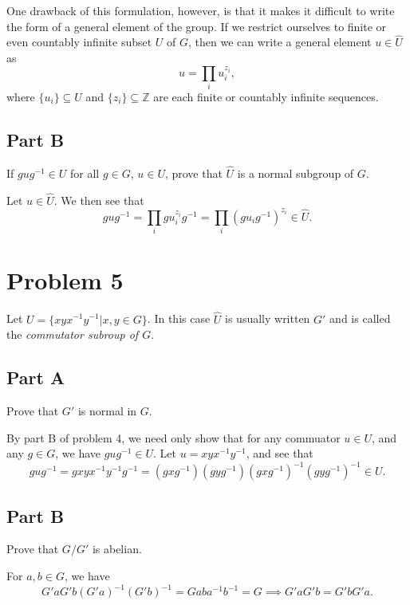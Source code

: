 \documentclass[12pt]{article}
\newcommand{\Z}{\mathbb{Z}}
\begin{document}
One drawback of this formulation, however, is that it makes it difficult to write
the form of a general element of the group.  If we restrict ourselves to finite or even
countably infinite subset $U$ of $G$, then we can write a general element $u\in\hat{U}$ as
\begin{equation*}
u = \prod_i u_i^{z_i},
\end{equation*}
where $\{u_i\}\subseteq U$ and $\{z_i\}\subseteq\Z$ are each finite or countably infinite sequences.

\subsection*{Part B}

If $gug^{-1}\in U$ for all $g\in G$, $u\in U$, prove that $\hat{U}$ is a normal
subgroup of $G$.

Let $u\in\hat{U}$.  We then see that
\begin{equation*}
gug^{-1} = \prod_i gu_i^{z_i}g^{-1} = \prod_i (gu_ig^{-1})^{z_i}\in\hat{U}.
\end{equation*}

\section{Problem 5}

Let $U=\{xyx^{-1}y^{-1}|x,y\in G\}$.  In this case $\hat{U}$ is usually written $G'$
and is called the {\it commutator subroup of $G$}.

\subsection*{Part A}

Prove that $G'$ is normal in $G$.

By part B of problem 4, we need only show that for any commuator $u\in U$, and
any $g\in G$, we have $gug^{-1}\in U$.  Let $u=xyx^{-1}y^{-1}$, and see that
\begin{equation*}
gug^{-1}=gxyx^{-1}y^{-1}g^{-1}=(gxg^{-1})(gyg^{-1})(gxg^{-1})^{-1}(gyg^{-1})^{-1}\in U.
\end{equation*}

\subsection*{Part B}

Prove that $G/G'$ is abelian.

For $a,b\in G$, we have
\begin{equation*}
G'aG'b(G'a)^{-1}(G'b)^{-1}=Gaba^{-1}b^{-1}=G\implies G'aG'b=G'bG'a.
\end{equation*}
\end{document}
